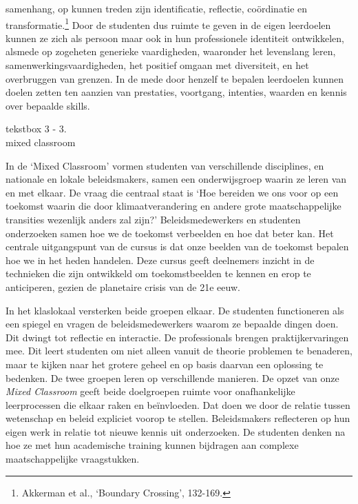 \documentclass[smallauthor, chapterhaspagenum, nochapterinheader, pagenuminheader,  bigchapnum,medium2, tocpages, garamond, titleinheader]{jote-book}
\begin{document}
samenhang, op kunnen treden zijn identificatie, reflectie, coördinatie en transformatie.\footnote{Akkerman et al., ‘Boundary Crossing', 132-169.} Door de studenten dus ruimte te geven in de eigen leerdoelen kunnen ze zich als persoon maar ook in hun professionele identiteit ontwikkelen, alsmede op zogeheten generieke vaardigheden, waaronder het levenslang leren, samenwerkingsvaardigheden, het positief omgaan met diversiteit, en het overbruggen van grenzen. In de mede door henzelf te bepalen leerdoelen kunnen doelen zetten ten aanzien van prestaties, voortgang, intenties, waarden en kennis over bepaalde skills.

	\enlargethispage{\baselineskip}\checkandfixthelayout
	\begin{bookbox}{\raggedright tekstbox 3 - 3. \\mixed classroom}
		In de ‘Mixed Classroom' vormen studenten van verschillende disciplines, en nationale en lokale beleidsmakers, samen een onderwijsgroep waarin ze leren van en met elkaar. De vraag die centraal staat is ‘Hoe bereiden we ons voor op een toekomst waarin die door klimaatverandering en andere grote maatschappelijke transities wezenlijk anders zal zijn?' Beleidsmedewerkers en studenten onderzoeken samen hoe we de toekomst verbeelden en hoe dat beter kan. Het centrale uitgangspunt van de cursus is dat onze beelden van de toekomst bepalen hoe we in het heden handelen. Deze cursus geeft deelnemers inzicht in de technieken die zijn ontwikkeld om toekomstbeelden te kennen en erop te anticiperen, gezien de planetaire crisis van de 21e eeuw.

		\vspace*{\baselineskip}

		In het klaslokaal versterken beide groepen elkaar. De studenten functioneren als een spiegel en vragen de beleidsmedewerkers waarom ze bepaalde dingen doen. Dit dwingt tot reflectie en interactie. De professionals brengen praktijkervaringen mee. Dit leert studenten om niet alleen vanuit de theorie problemen te benaderen, maar te kijken naar het grotere geheel en op basis daarvan een oplossing te bedenken. De twee groepen leren op verschillende manieren. De opzet van onze \emph{Mixed Classroom} geeft beide doelgroepen ruimte voor onafhankelijke leerprocessen die elkaar raken en beïnvloeden. Dat doen we door de relatie tussen wetenschap en beleid expliciet voorop te stellen. Beleidsmakers reflecteren op hun eigen werk in relatie tot nieuwe kennis uit onderzoeken. De studenten denken na hoe ze met hun academische training kunnen bijdragen aan complexe maatschappelijke vraagstukken.


\end{bookbox}
\end{document}
